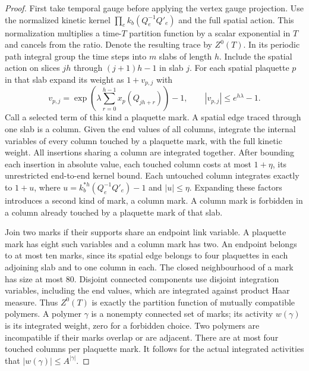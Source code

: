\begin{proof}
First take temporal gauge before applying the vertex gauge projection.
Use the normalized kinetic kernel $\prod_e k_b(Q_e^{-1}Q'_e)$ and the
full spatial action. This normalization multiplies a time-$T$ partition
function by a scalar exponential in $T$ and cancels from the ratio.
Denote the resulting trace by $Z^0(T)$. In its periodic path integral
group the time steps into $m$ slabs of length $h$. Include the spatial
action on slices $jh$ through $(j+1)h-1$ in slab $j$. For each spatial
plaquette $p$ in that slab expand its weight as $1+v_{p,j}$ with
\[
 v_{p,j}=\exp\!\left(\lambda\sum_{r=0}^{h-1}x_p(Q_{jh+r})\right)-1,
 \qquad |v_{p,j}|\le e^{h\lambda}-1.
\]
Call a selected term of this kind a plaquette mark. A spatial edge
traced through one slab is a column. Given the end values of all
columns, integrate the internal variables of every column touched by
a plaquette mark, with the full kinetic weight. All insertions sharing
a column are integrated together. After bounding each insertion in
absolute value, each touched column costs at most $1+\eta$, its
unrestricted end-to-end kernel bound. Each untouched column integrates
exactly to $1+u$, where $u=k_b^{*h}(Q_e^{-1}Q'_e)-1$ and $|u|\le\eta$.
Expanding these factors introduces a second kind of mark, a column
mark. A column mark is forbidden in a column already touched by a
plaquette mark of that slab.

Join two marks if their supports share an endpoint link variable.
A plaquette mark has eight such variables and a column mark has two.
An endpoint belongs to at most ten marks, since its spatial edge belongs
to four plaquettes in each adjoining slab and to one column in each.
The closed neighbourhood of a mark has size at most $80$. Disjoint
connected components use disjoint integration variables, including the
end values, which are integrated against product Haar measure. Thus
$Z^0(T)$ is exactly the partition function of mutually compatible
polymers. A polymer $\gamma$ is a nonempty connected set of marks;
its activity $w(\gamma)$ is its integrated weight, zero for a forbidden
choice. Two polymers are incompatible if their marks overlap or are
adjacent. There are at most four touched columns per plaquette mark.
It follows for the actual integrated activities that
$|w(\gamma)|\le A^{|\gamma|}$.


\end{proof}
